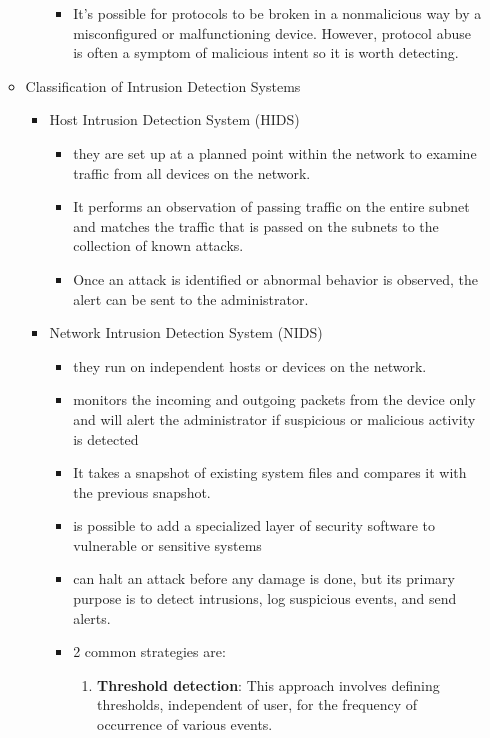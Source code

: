 \documentclass{article}
\begin{document}
\begin{itemize}
\begin{itemize}
\begin{itemize}
\begin{itemize}
                \item It’s possible for protocols to be broken in a nonmalicious way by a misconfigured or malfunctioning device. However, protocol abuse is often a symptom of malicious intent so it is worth detecting.
            \end{itemize}
        \end{itemize}
        \item Classification of Intrusion Detection Systems
        \begin{itemize}
            \item Host Intrusion Detection System (HIDS)
            \begin{itemize}
                \item they are set up at a planned point within the network to examine traffic from all devices on the network.
                \item It performs an observation of passing traffic on the entire subnet and matches the traffic that is passed on the subnets to the collection of known attacks.
                \item Once an attack is identified or abnormal behavior is observed, the alert can be sent to the administrator.
            \end{itemize}
            \item Network Intrusion Detection System (NIDS)
            \begin{itemize}
                \item they run on independent hosts or devices on the network.
                \item monitors the incoming and outgoing packets from the device only and will alert the administrator if suspicious or malicious activity is detected
                \item It takes a snapshot of existing system files and compares it with the previous snapshot.
                \item is possible to add a specialized layer of security software to vulnerable or sensitive systems
                \item can halt an attack before any damage is done, but its primary purpose is to detect intrusions, log suspicious events, and send alerts.
                \item 2 common strategies are:
                \begin{enumerate}
                    \item \textbf{Threshold detection}: This approach involves defining thresholds, independent of user, for the frequency of occurrence of various events.

\end{enumerate}
\end{itemize}
\end{itemize}
\end{itemize}
\end{itemize}
\end{document}
